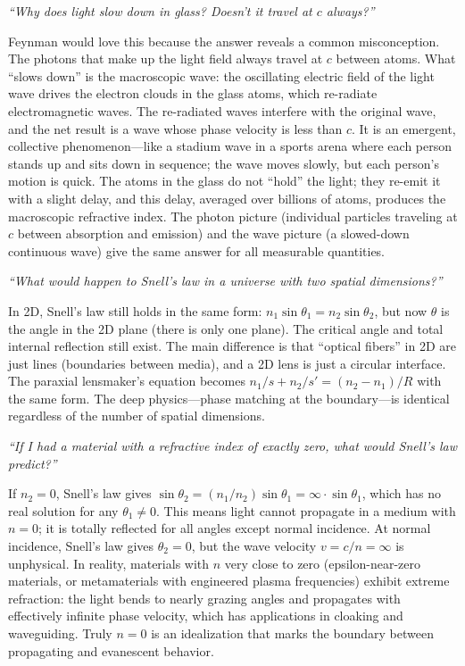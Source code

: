 \documentclass[11pt,openright]{book}
\begin{document}
\textit{``Why does light slow down in glass? Doesn't it travel at $c$ always?''}

Feynman would love this because the answer reveals a common misconception. The photons that make up the light field always travel at $c$ between atoms. What ``slows down'' is the macroscopic wave: the oscillating electric field of the light wave drives the electron clouds in the glass atoms, which re-radiate electromagnetic waves. The re-radiated waves interfere with the original wave, and the net result is a wave whose phase velocity is less than $c$. It is an emergent, collective phenomenon---like a stadium wave in a sports arena where each person stands up and sits down in sequence; the wave moves slowly, but each person's motion is quick. The atoms in the glass do not ``hold'' the light; they re-emit it with a slight delay, and this delay, averaged over billions of atoms, produces the macroscopic refractive index. The photon picture (individual particles traveling at $c$ between absorption and emission) and the wave picture (a slowed-down continuous wave) give the same answer for all measurable quantities.

\textit{``What would happen to Snell's law in a universe with two spatial dimensions?''}

In 2D, Snell's law still holds in the same form: $n_1\sin\theta_1 = n_2\sin\theta_2$, but now $\theta$ is the angle in the 2D plane (there is only one plane). The critical angle and total internal reflection still exist. The main difference is that ``optical fibers'' in 2D are just lines (boundaries between media), and a 2D lens is just a circular interface. The paraxial lensmaker's equation becomes $n_1/s + n_2/s' = (n_2 - n_1)/R$ with the same form. The deep physics---phase matching at the boundary---is identical regardless of the number of spatial dimensions.

\textit{``If I had a material with a refractive index of exactly zero, what would Snell's law predict?''}

If $n_2 = 0$, Snell's law gives $\sin\theta_2 = (n_1/n_2)\sin\theta_1 = \infty \cdot \sin\theta_1$, which has no real solution for any $\theta_1 \neq 0$. This means light cannot propagate in a medium with $n = 0$; it is totally reflected for all angles except normal incidence. At normal incidence, Snell's law gives $\theta_2 = 0$, but the wave velocity $v = c/n = \infty$ is unphysical. In reality, materials with $n$ very close to zero (epsilon-near-zero materials, or metamaterials with engineered plasma frequencies) exhibit extreme refraction: the light bends to nearly grazing angles and propagates with effectively infinite phase velocity, which has applications in cloaking and waveguiding. Truly $n = 0$ is an idealization that marks the boundary between propagating and evanescent behavior.
\end{document}
